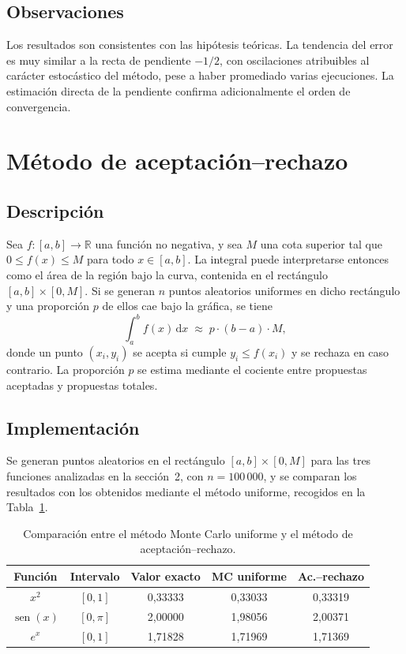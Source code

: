 \documentclass[11pt,a4paper]{article}
\newcommand{\cab}{\rowcolor{cabecera}}
\begin{document}
\subsection{Observaciones}
Los resultados son consistentes con las hipótesis teóricas. La tendencia del error es muy similar a la recta de pendiente $-1/2$, con oscilaciones atribuibles al carácter estocástico del método, pese a haber promediado varias ejecuciones. La estimación directa de la pendiente confirma adicionalmente el orden de convergencia.

\section{Método de aceptación–rechazo}

\subsection{Descripción}
Sea $f:[a,b]\to\mathbb{R}$ una función no negativa, y sea $M$ una cota superior tal que $0\le f(x)\le M$ para todo $x\in[a,b]$. La integral puede interpretarse entonces como el área de la región bajo la curva, contenida en el rectángulo $[a,b]\times[0,M]$. Si se generan $n$ puntos aleatorios uniformes en dicho rectángulo y una proporción $p$ de ellos cae bajo la gráfica, se tiene
\begin{equation}
\int_a^b f(x)\,\mathrm{d}x \;\approx\; p\cdot(b-a)\cdot M,
\end{equation}
donde un punto $(x_i,y_i)$ se acepta si cumple $y_i\le f(x_i)$ y se rechaza en caso contrario. La proporción $p$ se estima mediante el cociente entre propuestas aceptadas y propuestas totales.

\subsection{Implementación}
Se generan puntos aleatorios en el rectángulo $[a,b]\times[0,M]$ para las tres funciones analizadas en la sección~2, con $n = 100\,000$, y se comparan los resultados con los obtenidos mediante el método uniforme, recogidos en la Tabla~\ref{tab:t5}.

\begin{table}[H]
\centering
\caption{Comparación entre el método Monte Carlo uniforme y el método de aceptación–rechazo.}\label{tab:t5}
\begin{tabular}{ccccc}
\toprule
\cab \textbf{Función} & \textbf{Intervalo} & \textbf{Valor exacto} & \textbf{MC uniforme}\footnotemark & \textbf{Ac.–rechazo}\\
\midrule
$x^2$ & $[0,1]$ & 0,33333 & 0,33033 & 0,33319\\
$\operatorname{sen}(x)$ & $[0,\pi]$ & 2,00000 & 1,98056 & 2,00371\\
$e^x$ & $[0,1]$ & 1,71828 & 1,71969 & 1,71369\\
\bottomrule
\end{tabular}
\end{table}
\end{document}
